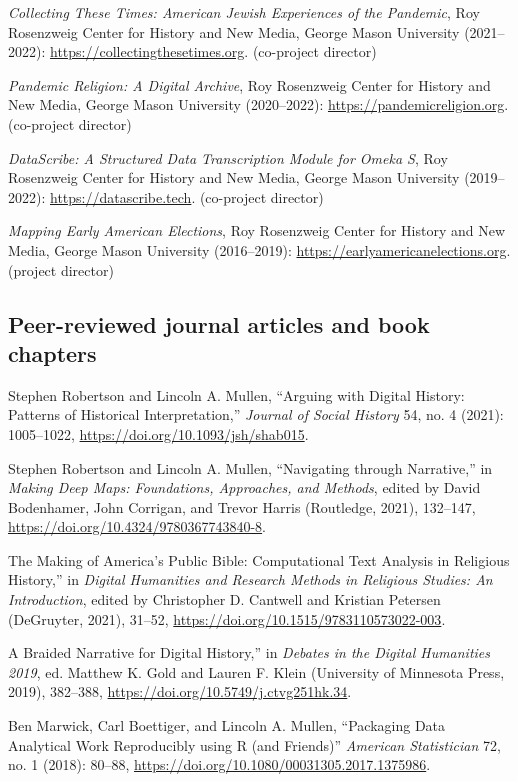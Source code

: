 \documentclass[11pt]{article}
\begin{document}
\emph{Collecting These Times: American Jewish Experiences of the Pandemic}, Roy Rosenzweig Center for History and New Media, George Mason University (2021--2022): \url{https://collectingthesetimes.org}. (co-project director)

\emph{Pandemic Religion: A Digital Archive}, Roy Rosenzweig Center for History and New Media, George Mason University (2020--2022): \url{https://pandemicreligion.org}. (co-project director)

\emph{DataScribe: A Structured Data Transcription Module for Omeka S}, Roy Rosenzweig Center for History and New Media, George Mason University (2019--2022): \url{https://datascribe.tech}. (co-project director)

\emph{Mapping Early American Elections}, Roy Rosenzweig Center for History and New Media, George Mason University (2016--2019): \url{https://earlyamericanelections.org}. (project director)

\subsection{Peer-reviewed journal articles and book chapters}\label{Peer-reviewed articles and chapters}

Stephen Robertson and Lincoln A. Mullen, ``Arguing with Digital History: Patterns of Historical Interpretation,'' \emph{Journal of Social History} 54, no. 4 (2021): 1005--1022, \url{https://doi.org/10.1093/jsh/shab015}.

Stephen Robertson and Lincoln A. Mullen, ``Navigating through Narrative,'' in \emph{Making Deep Maps: Foundations, Approaches, and Methods}, edited by David Bodenhamer, John Corrigan, and Trevor Harris (Routledge, 2021), 132--147, \url{https://doi.org/10.4324/9780367743840-8}.

\noindent{}The Making of America's Public Bible: Computational Text Analysis in Religious History,'' in \emph{Digital Humanities and Research Methods in Religious Studies: An Introduction}, edited by Christopher D. Cantwell and 
Kristian Petersen (DeGruyter, 2021), 31--52, \url{https://doi.org/10.1515/9783110573022-003}.

\noindent{}A Braided Narrative for Digital History,'' in \emph{Debates in the Digital Humanities 2019}, ed. Matthew K. Gold and Lauren F. Klein (University of Minnesota Press, 2019), 382--388, \url{https://doi.org/10.5749/j.ctvg251hk.34}.

Ben Marwick, Carl Boettiger, and Lincoln A. Mullen, ``Packaging Data Analytical Work Reproducibly using R (and Friends)'' \emph{American Statistician} 72, no. 1 (2018): 80--88, \url{https://doi.org/10.1080/00031305.2017.1375986}.
\end{document}
